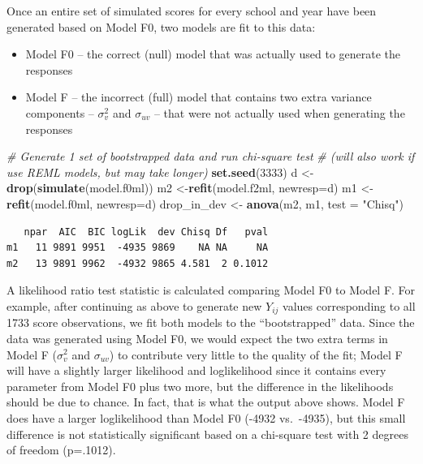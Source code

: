 \documentclass[
]{krantz}
\newenvironment{Shaded}{\begin{snugshade}}{\end{snugshade}}
\newcommand{\AttributeTok}[1]{\textcolor[rgb]{0.27,0.27,0.27}{#1}}
\newcommand{\CommentTok}[1]{\textcolor[rgb]{0.37,0.37,0.37}{\textit{#1}}}
\newcommand{\DecValTok}[1]{\textcolor[rgb]{0.06,0.06,0.06}{#1}}
\newcommand{\FunctionTok}[1]{\textcolor[rgb]{0.27,0.27,0.27}{\textbf{#1}}}
\newcommand{\NormalTok}[1]{#1}
\newcommand{\OtherTok}[1]{\textcolor[rgb]{0.37,0.37,0.37}{#1}}
\newcommand{\StringTok}[1]{\textcolor[rgb]{0.5,0.5,0.5}{#1}}
\providecommand{\tightlist}{%
  \setlength{\itemsep}{0pt}\setlength{\parskip}{0pt}}
\begin{document}
Once an entire set of simulated scores for every school and year have been generated based on Model F0, two models are fit to this data:

\begin{itemize}
\tightlist
\item
  Model F0 -- the correct (null) model that was actually used to generate the responses
\item
  Model F -- the incorrect (full) model that contains two extra variance components -- \(\sigma_{v}^{2}\) and \(\sigma_{uv}\) -- that were not actually used when generating the responses
\end{itemize}

\begin{Shaded}
\begin{Highlighting}[]
\CommentTok{\# Generate 1 set of bootstrapped data and run chi{-}square test}
\CommentTok{\#  (will also work if use REML models, but may take longer)}
\FunctionTok{set.seed}\NormalTok{(}\DecValTok{3333}\NormalTok{)}
\NormalTok{d }\OtherTok{\textless{}{-}} \FunctionTok{drop}\NormalTok{(}\FunctionTok{simulate}\NormalTok{(model.f0ml))}
\NormalTok{m2 }\OtherTok{\textless{}{-}}\FunctionTok{refit}\NormalTok{(model.f2ml, }\AttributeTok{newresp=}\NormalTok{d)}
\NormalTok{m1 }\OtherTok{\textless{}{-}}\FunctionTok{refit}\NormalTok{(model.f0ml, }\AttributeTok{newresp=}\NormalTok{d)}
\NormalTok{drop\_in\_dev }\OtherTok{\textless{}{-}} \FunctionTok{anova}\NormalTok{(m2, m1, }\AttributeTok{test =} \StringTok{"Chisq"}\NormalTok{)}
\end{Highlighting}
\end{Shaded}

\begin{verbatim}
   npar  AIC  BIC logLik  dev Chisq Df   pval
m1   11 9891 9951  -4935 9869    NA NA     NA
m2   13 9891 9962  -4932 9865 4.581  2 0.1012
\end{verbatim}

A likelihood ratio test statistic is calculated comparing Model F0 to Model F. For example, after continuing as above to generate new \(Y_{ij}\) values corresponding to all 1733 score observations, we fit both models to the ``bootstrapped'' data. Since the data was generated using Model F0, we would expect the two extra terms in Model F (\(\sigma^2_{v}\) and \(\sigma_{uv}\)) to contribute very little to the quality of the fit; Model F will have a slightly larger likelihood and loglikelihood since it contains every parameter from Model F0 plus two more, but the difference in the likelihoods should be due to chance. In fact, that is what the output above shows. Model F does have a larger loglikelihood than Model F0 (-4932 vs.~-4935), but this small difference is not statistically significant based on a chi-square test with 2 degrees of freedom (p=.1012).
\end{document}
